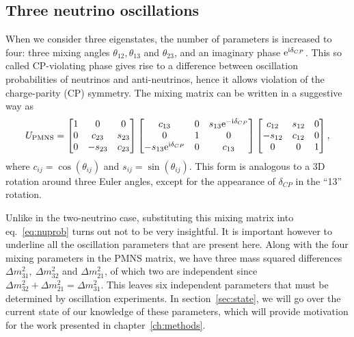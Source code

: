 \subsection{Three neutrino oscillations}
When we consider three eigenstates, the number of parameters is increased to
four\cite{langacker}:
three mixing angles $\theta_{12}, \theta_{13}$ and $\theta_{23}$, and an
imaginary phase $\mathrm{e}^{\mathrm{i} \delta_{CP}}$. This so called CP-violating phase gives rise to
a difference between oscillation probabilities of neutrinos and anti-neutrinos,
hence it allows violation of the charge-parity (CP) symmetry. 
The mixing matrix can be written in a suggestive way as
\begin{equation}\label{eq:PMNS}
U_{\mathrm{PMNS}} = 
\begin{bmatrix} 1 & 0 & 0 \\ 0 & c_{23} & s_{23} \\ 0 & -s_{23} & c_{23} \end{bmatrix}
\begin{bmatrix} c_{13} & 0 & s_{13} \mathrm{e}^{-\mathrm{i} \delta_{CP}} \\ 0 & 1 & 0 \\
								-s_{13} \mathrm{e}^{\mathrm{i} \delta_{CP}} & 0 & c_{13} \end{bmatrix} 
\begin{bmatrix} c_{12} & s_{12} & 0 \\ -s_{12} & c_{12} & 0 \\ 0 & 0 & 1 \end{bmatrix}
,\end{equation}
where $c_{ij} = \cos(\theta_{ij})$ and $s_{ij} = \sin(\theta_{ij})$.
This form is analogous to a 3D rotation around three Euler angles, except for
the appearance of $\delta_{CP}$ in the ``13'' rotation.

Unlike in the two-neutrino case, substituting this mixing matrix into
eq.~\ref{eq:nuprob} turns out not to be very insightful. It is important
however to underline all the oscillation parameters that are present here.
Along with the four mixing parameters in the PMNS matrix, we have three mass
squared differences $\Delta m^2_{31},~\Delta m^2_{32}$ and $\Delta m^2_{21}$,
of which two are independent since $\Delta m^2_{32} + \Delta m^2_{21} = \Delta
m^2_{31}$. This leaves six independent
parameters that must be determined by oscillation experiments.
In section~\ref{sec:state}, we will go over the current state of our knowledge
of these parameters, which will provide motivation for the work presented in
chapter~\ref{ch:methods}.


